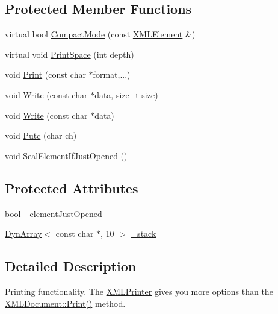 \subsection*{Protected Member Functions}
\begin{DoxyCompactItemize}
\item 
virtual bool \mbox{\hyperlink{classtinyxml2_1_1_x_m_l_printer_a38e1ed5a779bdf63eda9e808f7a6de66}{Compact\+Mode}} (const \mbox{\hyperlink{classtinyxml2_1_1_x_m_l_element}{X\+M\+L\+Element}} \&)
\item 
virtual void \mbox{\hyperlink{classtinyxml2_1_1_x_m_l_printer_a1c4b2ccbe4fdb316d54f5a93f3559260}{Print\+Space}} (int depth)
\item 
void \mbox{\hyperlink{classtinyxml2_1_1_x_m_l_printer_ab30210a7f32e45634e7a45137bf6fdf6}{Print}} (const char $\ast$format,...)
\item 
void \mbox{\hyperlink{classtinyxml2_1_1_x_m_l_printer_aff363b7634a27538fd691ae62adbda63}{Write}} (const char $\ast$data, size\+\_\+t size)
\item 
void \mbox{\hyperlink{classtinyxml2_1_1_x_m_l_printer_a4bd7f0cabca77ac95c299103fa9592f1}{Write}} (const char $\ast$data)
\item 
void \mbox{\hyperlink{classtinyxml2_1_1_x_m_l_printer_a9567b0218169ba59794f171ae2f9944c}{Putc}} (char ch)
\item 
void \mbox{\hyperlink{classtinyxml2_1_1_x_m_l_printer_ac6e2c72c5d796f5b4de6ce81ca95e3fa}{Seal\+Element\+If\+Just\+Opened}} ()
\end{DoxyCompactItemize}
\subsection*{Protected Attributes}
\begin{DoxyCompactItemize}
\item 
bool \mbox{\hyperlink{classtinyxml2_1_1_x_m_l_printer_ac07169d58b465214a2b1fa306e617c26}{\+\_\+element\+Just\+Opened}}
\item 
\mbox{\hyperlink{classtinyxml2_1_1_dyn_array}{Dyn\+Array}}$<$ const char $\ast$, 10 $>$ \mbox{\hyperlink{classtinyxml2_1_1_x_m_l_printer_a99d59e67e084714541bee3ae43884bef}{\+\_\+stack}}
\end{DoxyCompactItemize}


\subsection{Detailed Description}
Printing functionality. The \mbox{\hyperlink{classtinyxml2_1_1_x_m_l_printer}{X\+M\+L\+Printer}} gives you more options than the \mbox{\hyperlink{classtinyxml2_1_1_x_m_l_document_a867cf5fa3e3ff6ae4847a8b7ee8ec083}{X\+M\+L\+Document\+::\+Print()}} method.

